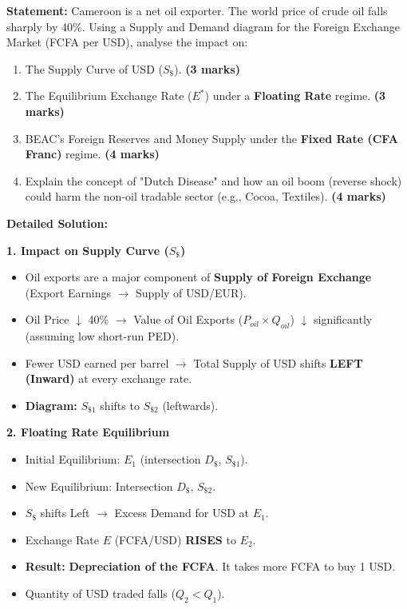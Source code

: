 \documentclass[11pt]{article}
\begin{document}
\begin{exoresolu}
\textbf{Statement:} Cameroon is a net oil exporter. The world price of crude oil falls sharply by 40\%. Using a Supply and Demand diagram for the Foreign Exchange Market (FCFA per USD), analyse the impact on:
\begin{enumerate}
    \item The Supply Curve of USD ($S_\$$). \textbf{(3 marks)}
    \item The Equilibrium Exchange Rate ($E^*$) under a \textbf{Floating Rate} regime. \textbf{(3 marks)}
    \item BEAC's Foreign Reserves and Money Supply under the \textbf{Fixed Rate (CFA Franc)} regime. \textbf{(4 marks)}
    \item Explain the concept of "Dutch Disease" and how an oil boom (reverse shock) could harm the non-oil tradable sector (e.g., Cocoa, Textiles). \textbf{(4 marks)}
\end{enumerate}

\tcblower
\textbf{Detailed Solution:}

\textbf{1. Impact on Supply Curve ($S_\$$)}
\begin{itemize}
    \item Oil exports are a major component of \textbf{Supply of Foreign Exchange} (Export Earnings $\rightarrow$ Supply of USD/EUR).
    \item Oil Price $\downarrow$ 40\% $\rightarrow$ Value of Oil Exports ($P_{oil} \times Q_{oil}$) $\downarrow$ significantly (assuming low short-run PED).
    \item Fewer USD earned per barrel $\rightarrow$ Total Supply of USD shifts \textbf{LEFT (Inward)} at every exchange rate.
    \item \textbf{Diagram:} $S_{\$1}$ shifts to $S_{\$2}$ (leftwards).
\end{itemize}

\textbf{2. Floating Rate Equilibrium}
\begin{itemize}
    \item Initial Equilibrium: $E_1$ (intersection $D_\$$, $S_{\$1}$).
    \item New Equilibrium: Intersection $D_\$$, $S_{\$2}$.
    \item $S_\$$ shifts Left $\rightarrow$ Excess Demand for USD at $E_1$.
    \item Exchange Rate $E$ (FCFA/USD) \textbf{RISES} to $E_2$.
    \item \textbf{Result:} \textbf{Depreciation of the FCFA}. It takes more FCFA to buy 1 USD.
    \item Quantity of USD traded falls ($Q_2 < Q_1$).
\end{itemize}


\end{exoresolu}
\end{document}
